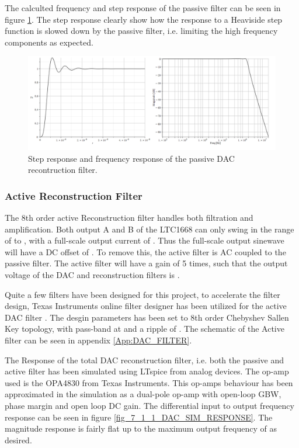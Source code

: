 The calculted frequency and step response of the passive filter can be seen in figure \ref{fig_7_1_1_DAC_PASSIVE_RESPONSE}. The step response clearly show how the response to a Heaviside step function is slowed down by the passive filter, i.e. limiting the high frequency components as expected.

\begin{figure}[H]
    \centering
    \includegraphics[clip, trim=0 0 0 0, width=1\textwidth]{Sections/7_SystemDesign/Figures/7_1_1_DAC_PASSIVE_RESPONSE.pdf}
    \caption{Step response and frequency response of the passive DAC recontruction filter.}
    \label{fig_7_1_1_DAC_PASSIVE_RESPONSE}
\end{figure}


\subsubsection{Active Reconstruction Filter}
The 8th order active Reconstruction filter handles both filtration and amplification. Both output A and B of the LTC1668 can only swing in the range of  to , with a full-scale output current of . Thus the full-scale output sinewave will have a DC offset of . To remove this, the active filter is AC coupled to the passive filter. The active filter will have a gain of 5 times, such that the output voltage of the DAC and reconstruction filters is .

Quite a few filters have been designed for this project, to accelerate the filter design, Texas Instruments online filter designer has been utilized for the active DAC filter \cite{TI_FILTER_TOOL}. The desgin parameters has been set to 8th order Chebyshev Sallen Key topology, with pass-band at  and a ripple of . The schematic of the Active filter can be seen in appendix \ref{App:DAC_FILTER}.

The Response of the total DAC reconstruction filter, i.e. both the passive and active filter has been simulated using LTspice from analog devices. The op-amp used is the OPA4830 from Texas Instruments. This op-amps behaviour has been approximated in the simulation as a dual-pole op-amp with  open-loop GBW,  phase margin and  open loop DC gain. The differential input to output frequency response can be seen in figure \ref{fig_7_1_1_DAC_SIM_RESPONSE}. The magnitude response is fairly flat up to the maximum output frequency of  as desired.

